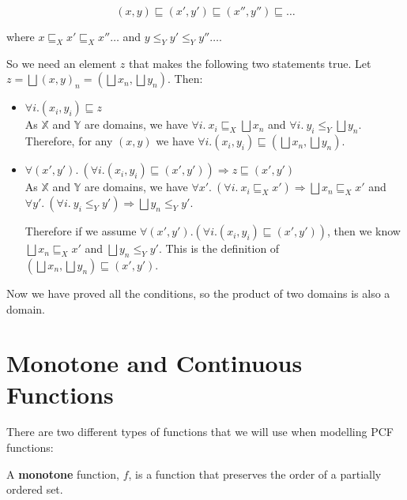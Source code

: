 \begin{enumerate}
{\[(x,y) \sqsubseteq (x', y') \sqsubseteq (x'', y'') \sqsubseteq \dots \]

where $x \sqsubseteq_X x' \sqsubseteq_X x'' \dots$ and $y \leq_Y y' \leq_Y y'' \dots $.

So we need an element $z$ that makes the following two statements true. Let $z = \bigsqcup (x, y)_n = (\bigsqcup x_n, \bigsqcup y_n)$. Then:

\begin{itemize}
\item{$\forall i. (x_i, y_i) \sqsubseteq z$ \\
As $\mathbb{X}$ and $\mathbb{Y}$ are domains, we have $\forall i. \ x_i \sqsubseteq_X \bigsqcup x_n$ and  $\forall i. \  y_i \leq_Y \bigsqcup y_n$. Therefore, for any $(x,y)$ we have $\forall i. (x_i ,y_i) \sqsubseteq (\bigsqcup x_n , \bigsqcup y_n)$.}
\item{$\forall (x',y'). \ (\forall i . (x_i,y_i) \sqsubseteq (x',y')) \Rightarrow z \sqsubseteq (x',y')$\\
As $\mathbb{X}$ and $\mathbb{Y}$ are domains, we have $\forall x'. \  (\forall i.\  x_i \sqsubseteq_X x') \Rightarrow \bigsqcup x_n \sqsubseteq_X x'$ and $\forall y'. \ (\forall i. \ y_i \leq_Y y') \Rightarrow \bigsqcup y_n \leq_Y y'$.

 Therefore if we assume $\forall (x',y'). (\forall i . (x_i,y_i) \sqsubseteq (x',y'))$, then we know $\bigsqcup x_n \sqsubseteq_X x'$ and $\bigsqcup y_n \leq_Y y'$. This is the definition of $(\bigsqcup x_n , \bigsqcup y_n) \sqsubseteq (x',y')$.
}
\end{itemize}

}
\end{enumerate}

\vspace{0.25cm}

Now we have proved all the conditions, so the product of two domains is also a domain.

\section{Monotone and Continuous Functions}
There are two different types of functions that we will use when modelling PCF functions:

\vspace{0.25cm}

\begin{defn}
A \textbf{monotone} function, $f$, is a function that preserves the order of a partially ordered set.
\end{defn}

